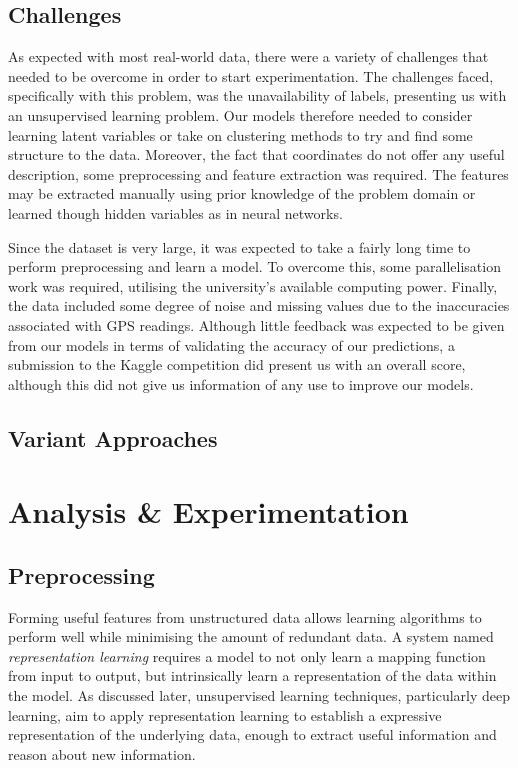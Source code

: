 \documentclass[a4paper, 11pt, twocolumn]{report}
\begin{document}
\subsection{Challenges}

As expected with most real-world data, there were a variety of challenges that needed to be overcome in order to start experimentation.
The challenges faced, specifically with this problem, was the unavailability of labels, presenting us with an unsupervised learning problem.
Our models therefore needed to consider learning latent variables or take on clustering methods to try and find some structure to the data.
Moreover, the fact that coordinates do not offer any useful description, some preprocessing and feature extraction was required.
The features may be extracted manually using prior knowledge of the problem domain or learned though hidden variables as in neural networks.

Since the dataset is very large, it was expected to take a fairly long time to perform preprocessing and learn a model.
To overcome this, some parallelisation work was required, utilising the university's available computing power.
Finally, the data included some degree of noise and missing values due to the inaccuracies associated with GPS readings.
Although little feedback was expected to be given from our models in terms of validating the accuracy of our predictions, a submission to the Kaggle competition did present us with an overall score, although this did not give us information of any use to improve our models.




\subsection{Variant Approaches}






\section{Analysis \& Experimentation}

\subsection{Preprocessing}

Forming useful features from unstructured data allows learning algorithms to perform well while minimising the amount of redundant data.
A system named \textit{representation learning} requires a model to not only learn a mapping function from input to output, but intrinsically learn a representation of the data within the model.
As discussed later, unsupervised learning techniques, particularly deep learning, aim to apply representation learning to establish a expressive representation of the underlying data, enough to extract useful information and reason about new information.
\end{document}
